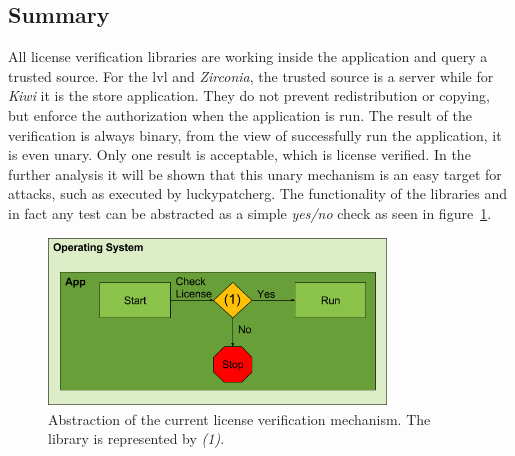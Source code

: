 \newpage
\subsection{Summary} \label{section:license-abstraction}
All license verification libraries are working inside the application and query a trusted source.
For the \gls{lvl} and \textit{Zirconia}, the trusted source is a server while for \textit{Kiwi} it is the store application.
They do not prevent redistribution or copying, but enforce the authorization when the application is run.
The result of the verification is always binary, from the view of successfully run the application, it is even unary.
Only one result is acceptable, which is license verified.
In the further analysis it will be shown that this unary mechanism is an easy target for attacks, such as executed by \gls{luckypatcherg}.
\newline
The functionality of the libraries and in fact any test can be abstracted as a simple \textit{yes/no} check as seen in figure~\ref{fig:verificationNow}.
\begin{figure}[h]
    \centering
    \includegraphics[width=0.8\textwidth]{data/verificationNow.png}
    \caption{Abstraction of the current license verification mechanism. The library is represented by \textit{(1)}.}
    \label{fig:verificationNow}
\end{figure}

